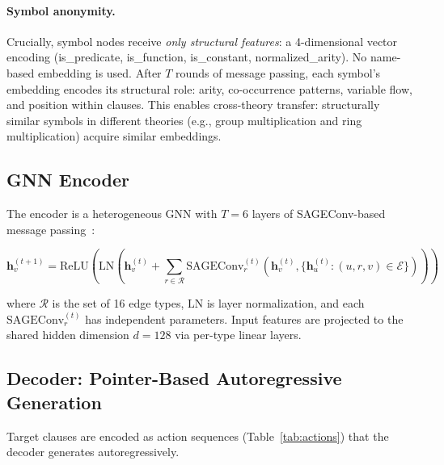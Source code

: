 \documentclass{article}
\begin{document}
\paragraph{Symbol anonymity.}
Crucially, symbol nodes receive \emph{only structural features}: a 4-dimensional
vector encoding (is\_predicate, is\_function, is\_constant, normalized\_arity).
No name-based embedding is used. After $T$ rounds of message passing, each symbol's
embedding encodes its structural role: arity, co-occurrence patterns, variable flow,
and position within clauses. This enables cross-theory transfer: structurally similar
symbols in different theories (e.g., group multiplication and ring multiplication)
acquire similar embeddings.

\subsection{GNN Encoder}
\label{sec:encoder}

The encoder is a heterogeneous GNN with $T{=}6$ layers of SAGEConv-based message
passing~\cite{hamilton2017inductive}:

\begin{equation}
\mathbf{h}_v^{(t+1)} = \text{ReLU}\!\left(\text{LN}\!\left(
    \mathbf{h}_v^{(t)} + \sum_{r \in \mathcal{R}} \text{SAGEConv}_r^{(t)}\!\left(
    \mathbf{h}_v^{(t)}, \{\mathbf{h}_u^{(t)} : (u,r,v) \in \mathcal{E}\}\right)
\right)\right)
\end{equation}

where $\mathcal{R}$ is the set of 16 edge types, $\text{LN}$ is layer normalization,
and each $\text{SAGEConv}_r^{(t)}$ has independent parameters. Input features are
projected to the shared hidden dimension $d{=}128$ via per-type linear layers.

\subsection{Decoder: Pointer-Based Autoregressive Generation}
\label{sec:decoder}

Target clauses are encoded as action sequences (Table~\ref{tab:actions}) that the
decoder generates autoregressively.
\end{document}

